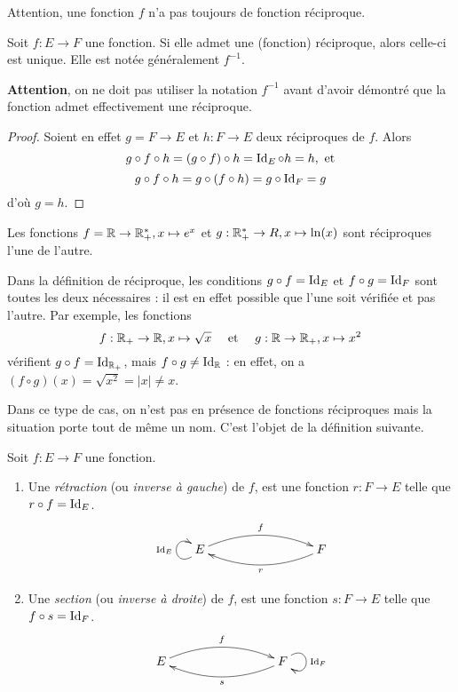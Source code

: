 Attention, une fonction $f$ n'a pas toujours de fonction réciproque.

\begin{proposition} Soit $f : E\to F$ une fonction. Si elle admet une (fonction) réciproque, alors celle-ci est unique. Elle est notée généralement $f^{-1}$.
\end{proposition}

\textbf{Attention}, on ne doit pas utiliser la notation $f^{-1}$ avant d'avoir démontré que la fonction admet effectivement une réciproque.

\begin{proof}
Soient en effet $g = F\to E$ et $h : F \to E$ deux réciproques de $f$. Alors
\[
g\circ  f \circ h = (g\circ f) \circ h = \operatorname{Id}_E \circ h = h, \text{ et}
\]
\[
g\circ  f \circ h = g\circ (f \circ h) = g \circ \operatorname{Id}_F = g
\]
d'où $g=h$.
\end{proof}

\begin{exemple}
Les fonctions $f = \mathbb{R}\to \mathbb{R}_+^*, x\mapsto e^x$ et $g : \mathbb{R}_+^*\to R, x\mapsto \ln(x)$ sont réciproques l'une de l'autre.
\end{exemple}

\begin{remarque}
Dans la définition de réciproque, les conditions $g\circ f = \operatorname{Id}_E$ et  $f\circ g = \operatorname{Id}_F$ sont toutes les deux nécessaires : il est en effet possible que l'une soit vérifiée et pas l'autre. Par exemple, les fonctions 
\[
f : \mathbb{R}_+\to \mathbb{R}, x\mapsto \sqrt x
\quad \text{ et }\quad
g : \mathbb{R}\to \mathbb{R}_+, x\mapsto x^2
\]
vérifient $g\circ f=\operatorname{Id}_{\mathbb{R}_+}$, mais $f\circ g \neq \operatorname{Id}_{\mathbb{R}}$ : en effet, on a $(f\circ g)(x)=\sqrt{x^2}=|x|\neq x$.

Dans ce type de cas, on n'est pas en présence de fonctions réciproques mais la situation porte tout de même un nom. C'est l'objet de la définition suivante.
\end{remarque}

\begin{definition}
Soit $f : E\to F$ une fonction.
\begin{enumerate}
\item Une \emph{rétraction} (ou \emph{inverse à gauche}) de $f$, est une fonction $r:F\to E$ telle que $r\circ f = \operatorname{Id}_E$.
\[
\xymatrix{
 E \ar@(dl,ul)^{\Id_E} \ar@/^1pc/[rrr]^{f}
& & & 
\ar@/^1pc/[lll]^{r}  F 
}
\]
\item Une \emph{section} (ou \emph{inverse à droite}) de $f$, est une fonction $s:F\to E$ telle que $f \circ s = \operatorname{Id}_F$.
\[
\xymatrix{
 E  \ar@/^1pc/[rrr]^{f} 
& & & 
\ar@/^1pc/[lll]^{s}  F \ar@(ur,dr)^{\Id_F}
}
\]
\end{enumerate}
\end{definition}


